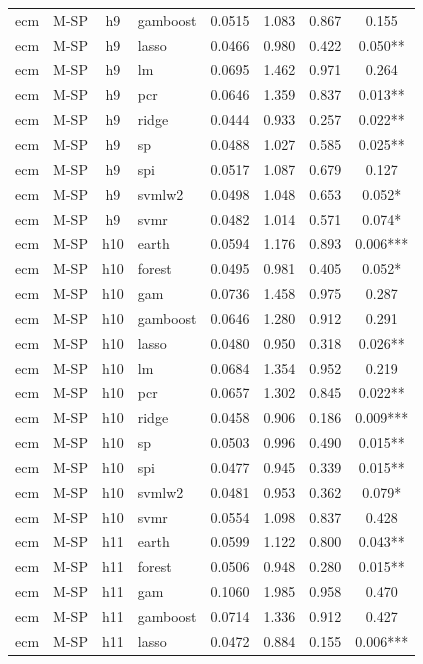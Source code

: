 \begin{ThreePartTable}
\begin{longtable}[t]{llclcccc}
ecm & M-SP & h9 & gamboost & 0.0515 & 1.083 & 0.867 & 0.155\\
ecm & M-SP & h9 & lasso & 0.0466 & 0.980 & 0.422 & 0.050**\\
ecm & M-SP & h9 & lm & 0.0695 & 1.462 & 0.971 & 0.264\\
ecm & M-SP & h9 & pcr & 0.0646 & 1.359 & 0.837 & 0.013**\\
ecm & M-SP & h9 & ridge & 0.0444 & 0.933 & 0.257 & 0.022**\\
ecm & M-SP & h9 & sp & 0.0488 & 1.027 & 0.585 & 0.025**\\
ecm & M-SP & h9 & spi & 0.0517 & 1.087 & 0.679 & 0.127\\
ecm & M-SP & h9 & svmlw2 & 0.0498 & 1.048 & 0.653 & 0.052*\\
ecm & M-SP & h9 & svmr & 0.0482 & 1.014 & 0.571 & 0.074*\\
\addlinespace
ecm & M-SP & h10 & earth & 0.0594 & 1.176 & 0.893 & 0.006***\\
ecm & M-SP & h10 & forest & 0.0495 & 0.981 & 0.405 & 0.052*\\
ecm & M-SP & h10 & gam & 0.0736 & 1.458 & 0.975 & 0.287\\
ecm & M-SP & h10 & gamboost & 0.0646 & 1.280 & 0.912 & 0.291\\
ecm & M-SP & h10 & lasso & 0.0480 & 0.950 & 0.318 & 0.026**\\
ecm & M-SP & h10 & lm & 0.0684 & 1.354 & 0.952 & 0.219\\
ecm & M-SP & h10 & pcr & 0.0657 & 1.302 & 0.845 & 0.022**\\
ecm & M-SP & h10 & ridge & 0.0458 & 0.906 & 0.186 & 0.009***\\
ecm & M-SP & h10 & sp & 0.0503 & 0.996 & 0.490 & 0.015**\\
ecm & M-SP & h10 & spi & 0.0477 & 0.945 & 0.339 & 0.015**\\
ecm & M-SP & h10 & svmlw2 & 0.0481 & 0.953 & 0.362 & 0.079*\\
ecm & M-SP & h10 & svmr & 0.0554 & 1.098 & 0.837 & 0.428\\
\addlinespace
ecm & M-SP & h11 & earth & 0.0599 & 1.122 & 0.800 & 0.043**\\
ecm & M-SP & h11 & forest & 0.0506 & 0.948 & 0.280 & 0.015**\\
ecm & M-SP & h11 & gam & 0.1060 & 1.985 & 0.958 & 0.470\\
ecm & M-SP & h11 & gamboost & 0.0714 & 1.336 & 0.912 & 0.427\\
ecm & M-SP & h11 & lasso & 0.0472 & 0.884 & 0.155 & 0.006***\\

\end{longtable}
\end{ThreePartTable}
